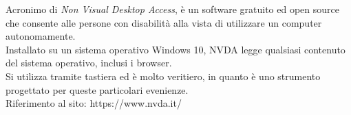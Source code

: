 Acronimo di \emph{Non Visual Desktop Access}, è un software gratuito ed open source che consente alle persone con disabilità alla vista di utilizzare un computer autonomamente.\\ 
Installato su un sistema operativo Windows 10, NVDA legge qualsiasi contenuto del sistema operativo, inclusi i browser.\\ 
Si utilizza tramite tastiera ed è molto veritiero, in quanto è uno strumento progettato per queste particolari evenienze.\\
Riferimento al sito: https://www.nvda.it/

\newpage
